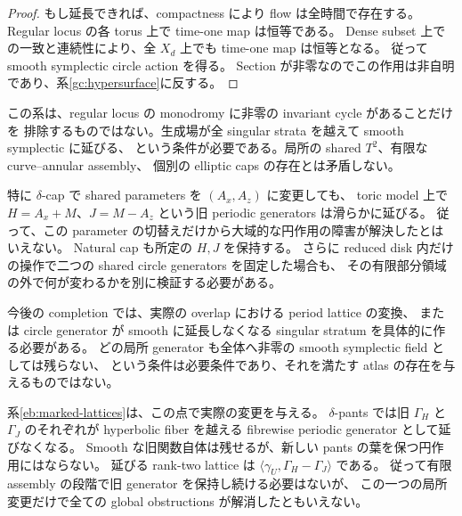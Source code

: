 \begin{proof}
もし延長できれば、compactness により flow は全時間で存在する。
Regular locus の各 torus 上で time-one map は恒等である。
Dense subset 上での一致と連続性により、全 $X_d$ 上でも time-one map は恒等となる。
従って smooth symplectic circle action を得る。
Section が非零なのでこの作用は非自明であり、系\ref{gc:hypersurface}に反する。
\end{proof}

この系は、regular locus の monodromy に非零の invariant cycle があることだけを
排除するものではない。生成場が全 singular strata を越えて smooth symplectic に延びる、
という条件が必要である。局所の shared $T^2$、有限な curve--annular assembly、
個別の elliptic caps の存在とは矛盾しない。

特に $\delta$-cap で shared parameters を $(A_x,A_z)$ に変更しても、
toric model 上で $H=A_x+M$、$J=M-A_z$ という旧 periodic generators は滑らかに延びる。
従って、この parameter の切替えだけから大域的な円作用の障害が解決したとはいえない。
Natural cap も所定の $H,J$ を保持する。
さらに reduced disk 内だけの操作で二つの shared circle generators を固定した場合も、
その有限部分領域の外で何が変わるかを別に検証する必要がある。

今後の completion では、実際の overlap における period lattice の変換、
または circle generator が smooth に延長しなくなる singular stratum を具体的に作る必要がある。
どの局所 generator も全体へ非零の smooth symplectic field としては残らない、
という条件は必要条件であり、それを満たす atlas の存在を与えるものではない。


系\ref{eb:marked-lattices}は、この点で実際の変更を与える。
$\delta$-pants では旧 $\Gamma_H$ と $\Gamma_J$ のそれぞれが
hyperbolic fiber を越える fibrewise periodic generator として延びなくなる。
Smooth な旧関数自体は残せるが、新しい pants の葉を保つ円作用にはならない。
延びる rank-two lattice は $\langle\gamma_U,\Gamma_H-\Gamma_J\rangle$ である。
従って有限 assembly の段階で旧 generator を保持し続ける必要はないが、
この一つの局所変更だけで全ての global obstructions が解消したともいえない。
